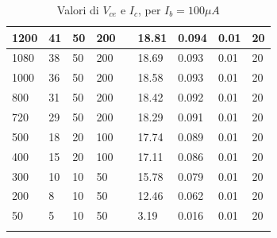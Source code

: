 \documentclass{article}
\begin{document}
\begin{longtable}[c]{|l|l|l|l|l|l|l|l|l|}
    1200          & 41                        & 50                        & 200                        &  & 18.81      & 0.094                      & 0.01                       & 20                         \\ \hline
    1080          & 38                        & 50                        & 200                        &  & 18.69      & 0.093                      & 0.01                       & 20                         \\ \hline
    1000          & 36                        & 50                        & 200                        &  & 18.58      & 0.093                      & 0.01                       & 20                         \\ \hline
    800           & 31                        & 50                        & 200                        &  & 18.42      & 0.092                      & 0.01                       & 20                         \\ \hline
    720           & 29                        & 50                        & 200                        &  & 18.29      & 0.091                      & 0.01                       & 20                         \\ \hline
    500           & 18                        & 20                        & 100                        &  & 17.74      & 0.089                      & 0.01                       & 20                         \\ \hline
    400           & 15                        & 20                        & 100                        &  & 17.11      & 0.086                      & 0.01                       & 20                         \\ \hline
    300           & 10                        & 10                        & 50                         &  & 15.78      & 0.079                      & 0.01                       & 20                         \\ \hline
    200           & 8                         & 10                        & 50                         &  & 12.46      & 0.062                      & 0.01                       & 20                         \\ \hline
    50            & 5                         & 10                        & 50                         &  & 3.19       & 0.016                      & 0.01                       & 20                         \\ \hline
    \caption{\label{tab:Tabella2}{Valori di $V_{ce}$ e $I_c$, per $I_b=100\mu A$}}                                                                                                                            \\
\end{longtable}
\end{document}
